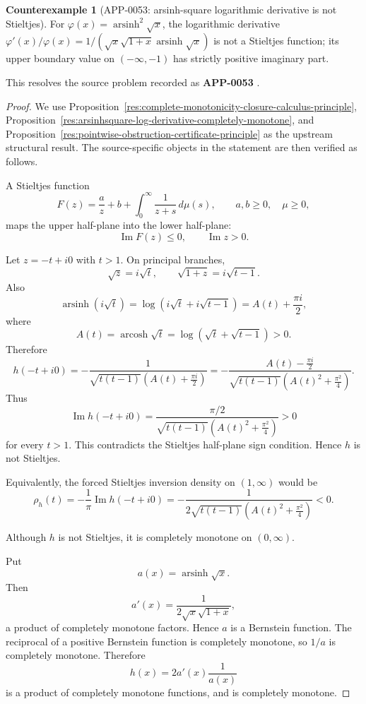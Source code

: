 \documentclass[11pt]{article}
\numberwithin{equation}{section}
\theoremstyle{definition}
\newtheorem{counterexample}[theorem]{Counterexample}
\theoremstyle{remark}
\newcommand{\1}{\mathbf 1}
\begin{document}
\begin{counterexample}[APP-0053: arsinh-square logarithmic derivative is not Stieltjes]
\label{res:not-arsinhsquare-log-derivative-stieltjes}
For \(\varphi(x)=\operatorname{arsinh}^2\sqrt{x}\), the logarithmic derivative \(\varphi'(x)/\varphi(x)=1/(\sqrt{x}\sqrt{1+x}\operatorname{arsinh}\sqrt{x})\) is not a Stieltjes function; its upper boundary value on \((-\infty,-1)\) has strictly positive imaginary part.



This resolves the source problem recorded as \textbf{APP-0053} \cite{app-app-0053-source}.
\end{counterexample}

\begin{proof}
We use Proposition~\ref{res:complete-monotonicity-closure-calculus-principle}, Proposition~\ref{res:arsinhsquare-log-derivative-completely-monotone}, and Proposition~\ref{res:pointwise-obstruction-certificate-principle} as the upstream structural result. The source-specific objects in the statement are then verified as follows.

A Stieltjes function
\[
F(z)=\frac{a}{z}+b+\int_0^\infty \frac{1}{z+s}\,d\mu(s),
\qquad a,b\ge0,\quad \mu\ge0,
\]
maps the upper half-plane into the lower half-plane:
\[
\operatorname{Im}F(z)\le0,\qquad \operatorname{Im}z>0.
\]

Let \(z=-t+i0\) with \(t>1\). On principal branches,
\[
\sqrt{z}=i\sqrt t,\qquad \sqrt{1+z}=i\sqrt{t-1}.
\]
Also
\[
\operatorname{arsinh}(i\sqrt t)
=\log\left(i\sqrt t+i\sqrt{t-1}\right)
=A(t)+\frac{\pi i}{2},
\]
where
\[
A(t)=\operatorname{arcosh}\sqrt t=\log(\sqrt t+\sqrt{t-1})>0.
\]
Therefore
\[
h(-t+i0)
=-\frac{1}{\sqrt{t(t-1)}\left(A(t)+\frac{\pi i}{2}\right)}
=-\frac{A(t)-\frac{\pi i}{2}}
{\sqrt{t(t-1)}\left(A(t)^2+\frac{\pi^2}{4}\right)}.
\]
Thus
\[
\operatorname{Im}h(-t+i0)
=\frac{\pi/2}
{\sqrt{t(t-1)}\left(A(t)^2+\frac{\pi^2}{4}\right)}>0
\]
for every \(t>1\). This contradicts the Stieltjes half-plane sign condition. Hence \(h\) is not Stieltjes.

Equivalently, the forced Stieltjes inversion density on \((1,\infty)\) would be
\[
\rho_h(t)=-\frac{1}{\pi}\operatorname{Im}h(-t+i0)
=-\frac{1}
{2\sqrt{t(t-1)}\left(A(t)^2+\frac{\pi^2}{4}\right)}<0.
\]

Although \(h\) is not Stieltjes, it is completely monotone on \((0,\infty)\).

Put
\[
a(x)=\operatorname{arsinh}\sqrt{x}.
\]
Then
\[
a'(x)=\frac{1}{2\sqrt{x}\sqrt{1+x}},
\]
a product of completely monotone factors. Hence \(a\) is a Bernstein function. The reciprocal of a positive Bernstein function is completely monotone, so \(1/a\) is completely monotone. Therefore
\[
h(x)=2a'(x)\frac1{a(x)}
\]
is a product of completely monotone functions, and is completely monotone.
\end{proof}
\end{document}
